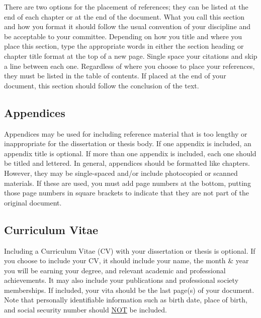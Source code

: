 There are two options for the placement of references; they can be listed at the end of each chapter or at the end of the document.
What you call this section and how you format it should follow the usual convention of your discipline and be acceptable to your committee.
Depending on how you title and where you place this section, type the appropriate words in either the section heading or chapter title format at the top of a new page.
Single space your citations and skip a line between each one.
Regardless of where you choose to place your references, they must be listed in the table of contents.
If placed at the end of your document, this section should follow the conclusion of the text.

\subsection{Appendices}

Appendices may be used for including reference material that is too lengthy or inappropriate for the dissertation or thesis body.
If one appendix is included, an appendix title is optional.
If more than one appendix is included, each one should be titled and lettered.
In general, appendices should be formatted like chapters.
However, they may be single-spaced and/or include photocopied or scanned materials.
If these are used, you must add page numbers at the bottom, putting those page numbers in square brackets to indicate that they are not part of the original document.

\subsection{Curriculum Vitae}

Including a Curriculum Vitae (CV) with your dissertation or thesis is optional.
If you choose to include your CV, it should include your name, the month \& year you will be earning your degree, and relevant academic and professional achievements.
It may also include your publications and professional society memberships.
If included, your vita should be the last page(s) of your document.
Note that personally identifiable information such as birth date, place of birth, and social security number should \underline{NOT} be included.
